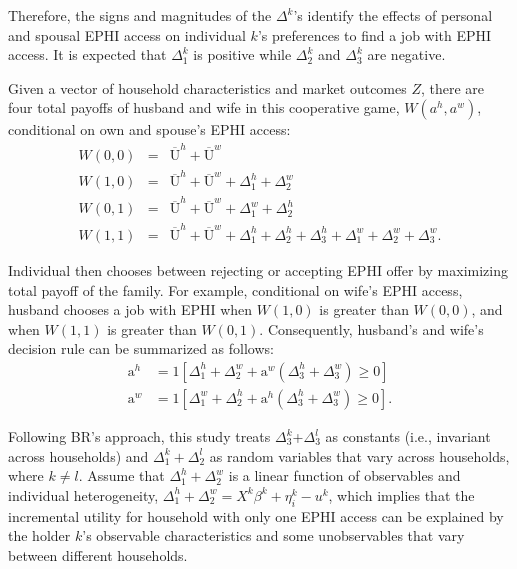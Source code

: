 \documentclass[legno,11pt]{article}
\begin{document}
Therefore, the signs and magnitudes of the $\Delta^{k}$'s
identify the effects of personal and spousal EPHI access on
individual $k$'s preferences to find a job with EPHI access. It is expected that $\Delta_{1}^{k}$ is positive while $\Delta_{2}^{k}$ and $\Delta_{3}^{k}$ are negative.
\par
Given a vector of household characteristics and market outcomes $Z$,
there are four total payoffs of husband and wife in this cooperative
game, $W(a^{h},a^{w})$, conditional on own and spouse's EPHI access:
\begin{eqnarray}
W(0,0)& = &\overline{\text{U}}^{h}+\overline{\text{U}}^{w}  \\
W(1,0)& = &\overline{\text{U}}^{h}+\overline{\text{U}}^{w}+\Delta^{h}_{1}+\Delta^{w}_{2} \\
W(0,1)&  = &\overline{\text{U}}^{h}+\overline{\text{U}}^{w}+\Delta^{w}_{1}+\Delta^{h}_{2} \\
W(1,1)&  = &\overline{\text{U}}^{h}+\overline{\text{U}}^{w}+\Delta^{h}_{1}+\Delta^{h}_{2}+\Delta^{h}_{3}+\Delta^{w}_{1}+\Delta^{w}_{2}+\Delta^{w}_{3}.
\end{eqnarray}
\par

Individual then chooses between rejecting or accepting EPHI offer by
maximizing total payoff of the family. For example, conditional on
wife's EPHI access, husband chooses a job with EPHI when $W(1,0)$ is
greater than
 $W(0,0)$, and when $W(1,1)$ is greater than $W(0,1)$. Consequently, husband's and wife's decision rule can be summarized as follows:
\begin{align}
\text{a}^{h}&= 1[\Delta_{1}^{h}+\Delta_{2}^{w}+\text{a}^{w}(\Delta_{3}^{h}+\Delta_{3}^{w})\geq 0]\label{oya_1}\\
\text{a}^{w}&= 1[\Delta_{1}^{w}+\Delta_{2}^{h}+\text{a}^{h}(\Delta_{3}^{h}+\Delta_{3}^{w})\geq 0]\label{oya_2}.
\end{align}
\par

 Following BR's approach,
this study treats $\Delta_{3}^{k}$+$\Delta_{3}^{l}$ as constants
  (i.e., invariant across households) and
   $\Delta_{1}^{k}+\Delta_{2}^{l}$ as random variables
   that vary across households, where $k\neq l$.
Assume that
   $\Delta_{1}^{h}+\Delta_{2}^{w}$ is a linear function
   of observables and individual heterogeneity,
   $\Delta_{1}^{h}+\Delta_{2}^{w}=X^{k}\beta^{k}+\eta^{k}_{i}-u^{k}$, which implies that the incremental utility for
   household with only one EPHI access can be explained by the holder $k$'s observable characteristics and
   some unobservables that vary between different households.
\end{document}
